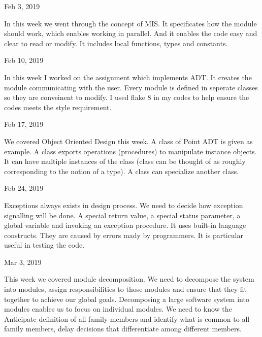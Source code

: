 \documentclass{article}
\begin{document}
\begin{flushleft}
Feb 3, 2019
\end{flushleft}
\par
In this week we went through the concept of MIS. It specificates how the module should work, which enables working in parallel. And it enables the code easy and clear to read or modify. It includes local functions, types and constants.

\begin{flushleft}
Feb 10, 2019
\end{flushleft}
\par
In this week I worked on the assignment which implements ADT. It creates the module communicating with the user. Every module is defined in seperate classes so they are conveinent to modify. I used flake 8 in my codes to help ensure the codes meets the style requirement.

\begin{flushleft}
Feb 17, 2019
\end{flushleft}
\par
We covered Object Oriented Design this week. A class of Point ADT is given as example. A class exports operations (procedures) to manipulate instance objects. It can have multiple instances of the class (class can be thought of as roughly corresponding to the notion of a type). A class can specialize another class.

\begin{flushleft}
Feb 24, 2019
\end{flushleft}
\par
Exceptions always exists in design process. We need to decide how exception signalling will be done. A special return value, a special status parameter, a global variable and invoking an exception procedure. It uses built-in language constructs. They are caused by errors mady by programmers. It is particular useful in testing the code.


\begin{flushleft}
Mar 3, 2019
\end{flushleft}
\par
This week we covered module decomposition. We need to decompose the system into modules, assign responsibilities to those modules and ensure that they fit together to achieve our global goals. Decomposing a large software system into modules enables us to focus on individual modules. We need to know the Anticipate definition of all family members and identify what is common to all family members, delay decisions that differentiate among different members.
\end{document}
